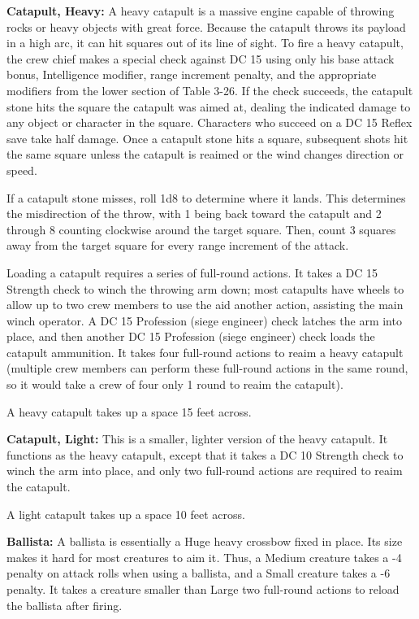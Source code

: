 \documentclass{article}
\begin{document}
\vspace{12pt}
\textbf{Catapult, Heavy: }A heavy catapult is a massive engine capable of throwing 
rocks or heavy objects with great force. Because the catapult throws its payload 
in a high arc, it can hit squares out of its line of sight. To fire a heavy catapult, 
the crew chief makes a special check against DC 15 using only his base attack bonus, 
Intelligence modifier, range increment penalty, and the appropriate modifiers from 
the lower section of Table 3-26. If the check succeeds, the catapult stone hits 
the square the catapult was aimed at, dealing the indicated damage to any object 
or character in the square. Characters who succeed on a DC 15 Reflex save take 
half damage. Once a catapult stone hits a square, subsequent shots hit the same 
square unless the catapult is reaimed or the wind changes direction or speed.

If a catapult stone misses, roll 1d8 to determine where it lands. This determines 
the misdirection of the throw, with 1 being back toward the catapult and 2 through 
8 counting clockwise around the target square. Then, count 3 squares away from 
the target square for every range increment of the attack.

Loading a catapult requires a series of full-round actions. It takes a DC 15 Strength 
check to winch the throwing arm down; most catapults have wheels to allow up to 
two crew members to use the aid another action, assisting the main winch operator. 
A DC 15 Profession (siege engineer) check latches the arm into place, and then 
another DC 15 Profession (siege engineer) check loads the catapult ammunition. 
It takes four full-round actions to reaim a heavy catapult (multiple crew members 
can perform these full-round actions in the same round, so it would take a crew 
of four only 1 round to reaim the catapult).

A heavy catapult takes up a space 15 feet across.

\textbf{Catapult, Light: }This is a smaller, lighter version of the heavy catapult. 
It functions as the heavy catapult, except that it takes a DC 10 Strength check 
to winch the arm into place, and only two full-round actions are required to reaim 
the catapult.

A light catapult takes up a space 10 feet across.

\textbf{Ballista:} A ballista is essentially a Huge heavy crossbow fixed in place. 
Its size makes it hard for most creatures to aim it\textit{. }Thus, a Medium creature 
takes a -4 penalty on attack rolls when using a ballista, and a Small creature 
takes a -6 penalty. It takes a creature smaller than Large two full-round actions 
to reload the ballista after firing.
\end{document}
